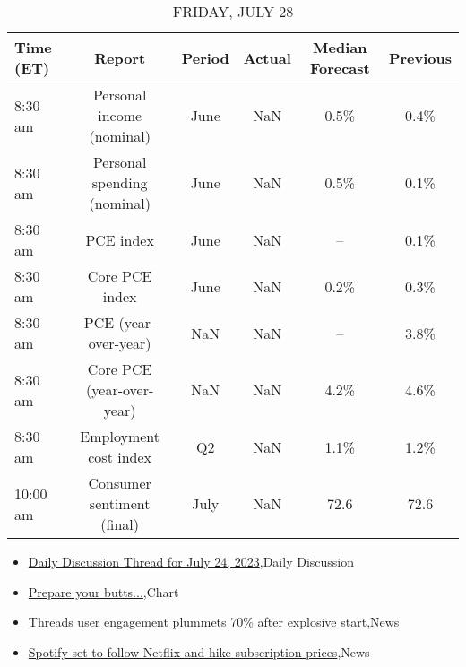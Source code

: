 \documentclass{article}%
\begin{document}
\begin{table}[htbp]%
\caption{FRIDAY, JULY 28}%
\centering%
\begin{adjustbox}{width=1\textwidth}%
\begin{tabular}{lccccc}
\toprule
Time (ET) &                      Report & Period & Actual & Median Forecast & Previous \\
\midrule
  8:30 am &   Personal income (nominal) &   June &    NaN &            0.5\% &     0.4\% \\
  8:30 am & Personal spending (nominal) &   June &    NaN &            0.5\% &     0.1\% \\
  8:30 am &                   PCE index &   June &    NaN &              -- &     0.1\% \\
  8:30 am &              Core PCE index &   June &    NaN &            0.2\% &     0.3\% \\
  8:30 am &        PCE (year-over-year) &    NaN &    NaN &              -- &     3.8\% \\
  8:30 am &   Core PCE (year-over-year) &    NaN &    NaN &            4.2\% &     4.6\% \\
  8:30 am &       Employment cost index &     Q2 &    NaN &            1.1\% &     1.2\% \\
 10:00 am &  Consumer sentiment (final) &   July &    NaN &            72.6 &     72.6 \\
\bottomrule
\end{tabular}
%
\end{adjustbox}%
\end{table}

%
\begin{itemize}%
\item%
\href{https://reddit.com/r/wallstreetbets/comments/15867vy/daily\_discussion\_thread\_for\_july\_24\_2023/}{Daily Discussion Thread for July 24, 2023},Daily Discussion%
\item%
\href{https://reddit.com/r/wallstreetbets/comments/1580qy4/prepare\_your\_butts/}{Prepare your butts...},Chart%
\item%
\href{https://reddit.com/r/wallstreetbets/comments/157w3yw/threads\_user\_engagement\_plummets\_70\_after/}{Threads user engagement plummets 70\% after explosive start},News%
\item%
\href{https://reddit.com/r/wallstreetbets/comments/157vh49/spotify\_set\_to\_follow\_netflix\_and\_hike/}{Spotify set to follow Netflix and hike subscription prices},News%
\end{itemize}%
\end{document}
